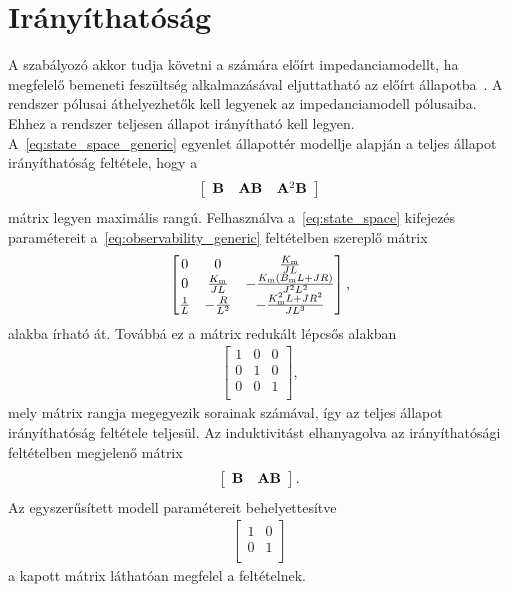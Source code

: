 \section{Irányíthatóság}\label{chap:controllability}
A szabályozó akkor tudja követni a számára előírt impedanciamodellt, 
ha megfelelő bemeneti feszültség alkalmazásával eljuttatható az előírt állapotba~\citep{kalman1963controllability}.
A rendszer pólusai áthelyezhetők kell legyenek az impedanciamodell pólusaiba. Ehhez 
a rendszer teljesen állapot irányítható kell legyen.
A~\eqref{eq:state_space_generic} egyenlet állapottér modellje alapján a teljes állapot irányíthatóság feltétele, hogy a
\begin{align}\label{eq:controllability_generic}
    \left[\begin{array}{c|c|c}
        \mathbf{B} & \mathbf{AB} & \mathbf{A}^2 \mathbf{B}
    \end{array}\right]
\end{align}
mátrix legyen maximális rangú. 
Felhasználva a~\eqref{eq:state_space} kifejezés paramétereit a~\eqref{eq:observability_generic} feltételben szereplő mátrix
\begin{align}
    \begin{bmatrix}
        0 & 0 & \frac{K_{\mathrm{m}}}{JL} \\
        0 & \frac{K_{\mathrm{m}}}{JL} & -\frac{K_{\mathrm{m}}\left(B_{\mathrm{m}} L + JR\right)}{J^2 L^2} \\
        \frac{1}{L} & -\frac{R}{L^2} & -\frac{K^2_{\mathrm{m}} L + JR^2}{J L^3} \\
    \end{bmatrix},
\end{align}
alakba írható át. Továbbá ez a mátrix redukált lépcsős alakban
\begin{align}
    \begin{bmatrix}
        1 & 0 & 0 \\
        0 & 1 & 0 \\
        0 & 0 & 1 \\
    \end{bmatrix},
\end{align}
mely mátrix rangja megegyezik sorainak számával, így az teljes állapot irányíthatóság feltétele teljesül.
Az induktivitást elhanyagolva az irányíthatósági feltételben megjelenő mátrix 
\begin{align}
    \left[\begin{array}{c|c}
        \mathbf{B} & \mathbf{AB}
    \end{array}\right].
\end{align}
Az egyszerűsített modell paramétereit behelyettesítve
\begin{align}
    \begin{bmatrix}
        1 & 0 \\
        0 & 1 \\
    \end{bmatrix}
\end{align}
a kapott mátrix láthatóan megfelel a feltételnek.

